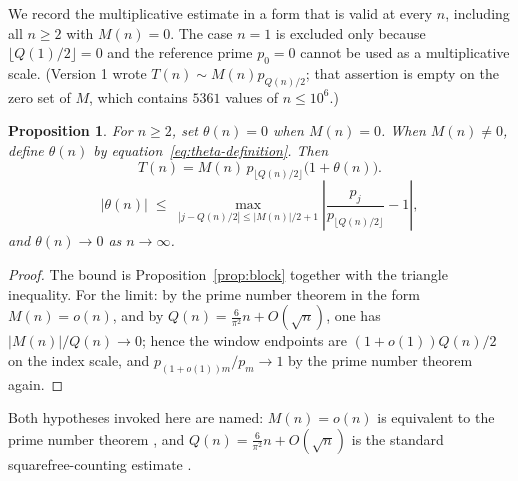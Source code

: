 \documentclass[11pt]{amsart}
\numberwithin{equation}{section}
\theoremstyle{plain}
\newtheorem{proposition}[theorem]{Proposition}
\theoremstyle{definition}
\theoremstyle{remark}
\newcommand{\Mert}{M}
\newcommand{\Sq}{Q}
\begin{document}
We record the multiplicative estimate in a form that is valid at every $n$,
including all $n\ge2$ with $\Mert(n)=0$. The case $n=1$ is excluded only because
$\lfloor\Sq(1)/2\rfloor=0$ and the reference prime $p_0=0$ cannot be used as a
multiplicative scale. (Version 1 wrote
$T(n)\sim \Mert(n)p_{\Sq(n)/2}$; that assertion is empty on the zero set of
$\Mert$, which contains $5361$ values of $n\le10^{6}$.)

\begin{proposition}\label{prop:scale}
For $n\ge2$, set $\theta(n)=0$ when $M(n)=0$. When $M(n)\ne0$, define
$\theta(n)$ by equation~\eqref{eq:theta-definition}. Then
\begin{equation}
\label{eq:theta-definition}
T(n)=M(n)\,p_{\lfloor Q(n)/2\rfloor}\bigl(1+\theta(n)\bigr).
\end{equation}
\begin{equation}
\label{eq:theta-bound}
|\theta(n)|\;\le\;
\max_{|j-\Sq(n)/2|\le |\Mert(n)|/2+1}
\left|\frac{p_j}{p_{\lfloor \Sq(n)/2\rfloor}}-1\right| ,
\end{equation}
and $\theta(n)\to0$ as $n\to\infty$.
\end{proposition}

\begin{proof}
The bound is Proposition~\ref{prop:block} together with the triangle
inequality. For the limit: by the prime number theorem in the form
$\Mert(n)=o(n)$, and by $\Sq(n)=\tfrac{6}{\pi^2}n+O(\sqrt n)$, one has
$|\Mert(n)|/\Sq(n)\to0$; hence the window endpoints are
$(1+o(1))\Sq(n)/2$ on the index scale, and $p_{(1+o(1))m}/p_m\to1$ by the prime
number theorem again.
\end{proof}

Both hypotheses invoked here are named: $\Mert(n)=o(n)$ is equivalent to the prime number theorem
\cite{Titchmarsh1986}, and $\Sq(n)=\tfrac6{\pi^2}n+O(\sqrt n)$ is the standard
squarefree-counting estimate \cite{Apostol1976}.
\end{document}
